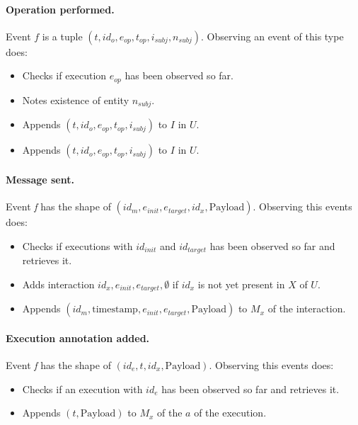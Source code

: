 \paragraph*{Operation performed.}
Event $f$ is a tuple $(t, id_o, e_{op}, t_{op}, i_{subj}, n_{subj})$. Observing an event of this type does:%
\begin{itemize}
	\item Checks if execution $e_{op}$ has been observed so far.
	\item Notes existence of entity $n_{subj}$.
	\item Appends $(t, id_o, e_{op}, t_{op}, i_{subj})$ to $I$ in $U$.
	\item Appends $(t, id_o, e_{op}, t_{op}, i_{subj})$ to $I$ in $U$.
\end{itemize}

\paragraph*{Message sent.} 
Event \textit{f} has the shape of $(id_{m}, e_{init}, e_{target}, id_{x}, \text{Payload})$. Observing this events does:
\begin{itemize}
	\item Checks if executions with $id_{init}$ and $id_{target}$ has been observed so far and retrieves it.
	\item Adds interaction ${ id_{x}, e_{init}, e_{target}, \emptyset }$ if $id_{x}$ is not yet present in $X$ of $U$.
	\item Appends $( id_{m}, \mathrm{timestamp}, e_{init}, e_{target}, \text{Payload})$ to $M_x$ of the interaction.
\end{itemize}

\paragraph*{Execution annotation added.}
Event \textit{f} has the shape of $(id_{e}, t, id_{x}, \text{Payload})$. Observing this events does:
\begin{itemize}
	\item Checks if an execution with $id_{e}$ has been observed so far and retrieves it.
	\item Appends $( t, \text{Payload})$ to $M_x$ of the $a$ of the execution.
\end{itemize}



